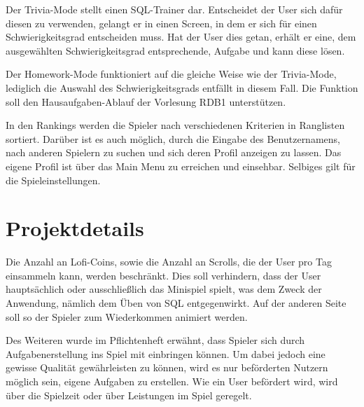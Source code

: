 Der Trivia-Mode stellt einen SQL-Trainer dar. Entscheidet der User sich dafür diesen zu verwenden, gelangt er in einen Screen, in dem er sich für einen Schwierigkeitsgrad entscheiden muss. Hat der User dies getan, erhält er eine, dem ausgewählten Schwierigkeitsgrad entsprechende, Aufgabe und kann diese lösen.

Der Homework-Mode funktioniert auf die gleiche Weise wie der Trivia-Mode, lediglich die Auswahl des Schwierigkeitsgrads entf\"allt in diesem Fall.
Die Funktion soll den Hausaufgaben-Ablauf der Vorlesung RDB1 unterstützen.

In den Rankings werden die Spieler nach verschiedenen Kriterien in Ranglisten sortiert. Darüber ist es auch möglich, durch die Eingabe des Benutzernamens, nach anderen Spielern zu suchen und sich deren Profil anzeigen zu lassen.
Das eigene Profil ist über das Main Menu zu erreichen und einsehbar. Selbiges gilt für die Spieleinstellungen.  



\section{Projektdetails}

Die Anzahl an Lofi-Coins, sowie die Anzahl an Scrolls, die der User pro Tag einsammeln kann, werden beschr\"ankt.
Dies soll verhindern, dass der User hauptsächlich oder ausschließlich das Minispiel spielt, was dem Zweck der Anwendung, nämlich dem Üben von SQL entgegenwirkt. Auf der anderen Seite soll so der Spieler zum Wiederkommen animiert werden.

Des Weiteren wurde im Pflichtenheft erwähnt, dass Spieler sich durch Aufgabenerstellung ins Spiel mit einbringen können. Um dabei jedoch eine gewisse Qualität gewährleisten zu k\"onnen, wird es nur beförderten Nutzern möglich sein, eigene Aufgaben zu erstellen. Wie ein User befördert wird, wird über die Spielzeit oder über Leistungen im Spiel geregelt.  









